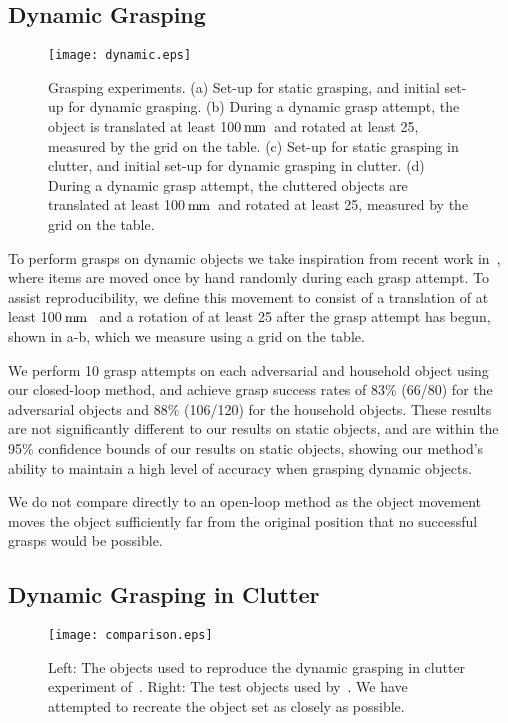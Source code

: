 \documentclass[conference]{IEEEtran}
\newcommand{\pack}	{\hspace{-0.08em}}
\newcommand{\mm}	{\ensuremath{\rm\,m\pack m}}
\begin{document}
\subsection{Dynamic Grasping}
\label{sec:dynamic}

\begin{figure}[tpb]
    \centering
    \texttt{[image: dynamic.eps]}
    \vspace{-8mm}
    \caption{Grasping experiments. (a) Set-up for static grasping, and initial set-up for dynamic grasping. (b) During a dynamic grasp attempt, the object is translated at least 100\mm~and rotated at least 25, measured by the grid on the table.  (c) Set-up for static grasping in clutter, and initial set-up for dynamic grasping in clutter.  (d) During a dynamic grasp attempt, the cluttered objects are translated at least 100\mm~and rotated at least 25, measured by the grid on the table.
    }
    \label{fig:dynamic} 
    \vspace{-6mm}
\end{figure}

To perform grasps on dynamic objects we take inspiration from recent work in~\cite{Viereck2017LearningImages}, where items are moved once by hand randomly during each grasp attempt.  To assist reproducibility, we define this movement to consist of a translation of at least 100\mm~ and a rotation of at least 25 after the grasp attempt has begun, shown in a-b, which we measure using a grid on the table.    

We perform 10 grasp attempts on each adversarial and household object using our closed-loop method, and achieve grasp success rates of 83\% (66/80) for the adversarial objects and 88\% (106/120) for the household objects.  These results are not significantly different to our results on static objects, and are within the 95\% confidence bounds of our results on static objects, showing our method's ability to maintain a high level of accuracy when grasping dynamic objects.  

We do not compare directly to an open-loop method as the object movement moves the object sufficiently far from the original position that no successful grasps would be possible. 


\subsection{Dynamic Grasping in Clutter}
\label{sec:clutter}

\begin{figure}[tpb]
    \centering
    \texttt{[image: comparison.eps]}
    \vspace{-6mm}
    \caption{Left: The objects used to reproduce the dynamic grasping in clutter experiment of~\cite{Viereck2017LearningImages}.  Right: The test objects used by~\cite{Viereck2017LearningImages}. We have attempted to recreate the object set as closely as possible.}
    \label{fig:comparison} 
    \vspace{-6mm}
\end{figure}
\end{document}
